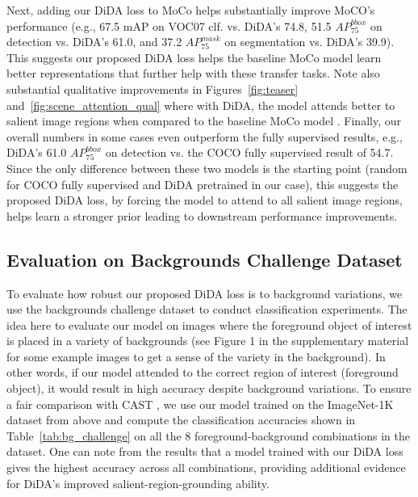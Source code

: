 \documentclass[10pt,twocolumn,letterpaper]{article}
\begin{document}
Next, adding our DiDA loss to MoCo \cite{he2020momentum} helps substantially improve MoCO's performance (e.g., 67.5 mAP on VOC07 clf. vs. DiDA's 74.8, 51.5 $AP^{bbox}_{75}$ on detection vs. DiDA's 61.0, and 37.2 $AP^{mask}_{75}$ on segmentation vs. DiDA's 39.9). This suggests our proposed DiDA loss helps the baseline MoCo model learn better representations that further help with these transfer tasks. Note also substantial qualitative improvements in Figures~\ref{fig:teaser} and~\ref{fig:scene_attention_qual} where with DiDA, the model attends better to salient image regions when compared to the baseline MoCo model \cite{he2020momentum}. Finally, our overall numbers in some cases even outperform the fully supervised results, e.g., DiDA's 61.0 $AP^{bbox}_{75}$ on detection vs. the COCO fully supervised result of 54.7. Since the only difference between these two models is the starting point (random for COCO fully supervised and DiDA pretrained in our case), this suggests the proposed DiDA loss, by forcing the model to attend to all salient image regions, helps learn a stronger prior leading to downstream performance improvements. 



\subsection{Evaluation on Backgrounds Challenge Dataset}

To evaluate how robust our proposed DiDA loss is to background variations, we use the backgrounds challenge dataset \cite{xiao2020noise} to conduct classification experiments. The idea here to evaluate our model on images where the foreground object of interest is placed in a variety of backgrounds (see Figure 1 in the supplementary material for some example images to get a sense of the variety in the background). In other words, if our model attended to the correct region of interest (foreground object), it would result in high accuracy despite background variations. To ensure a fair comparison with CAST \cite{selvaraju2021casting}, we use our model trained on the ImageNet-1K dataset from above and compute the classification accuracies shown in Table~\ref{tab:bg_challenge} on all the 8 foreground-background combinations in the dataset. One can note from the results that a model trained with our DiDA loss gives the highest accuracy across all combinations, 
providing additional evidence for DiDA's improved salient-region-grounding ability.  
\end{document}
